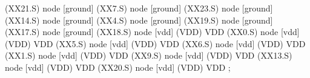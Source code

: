\begin{circuitikz}[american]

	(XX21.S) node [ground] {}
	(XX7.S) node [ground] {}
	(XX23.S) node [ground] {}
	(XX14.S) node [ground] {}
	(XX4.S) node [ground] {}
	(XX19.S) node [ground] {}
	(XX17.S) node [ground] {}
	(XX18.S) node [vdd] (VDD) {VDD}
	(XX0.S) node [vdd] (VDD) {VDD}
	(XX5.S) node [vdd] (VDD) {VDD}
	(XX6.S) node [vdd] (VDD) {VDD}
	(XX1.S) node [vdd] (VDD) {VDD}
	(XX9.S) node [vdd] (VDD) {VDD}
	(XX13.S) node [vdd] (VDD) {VDD}
	(XX20.S) node [vdd] (VDD) {VDD}
;

\end{circuitikz}
